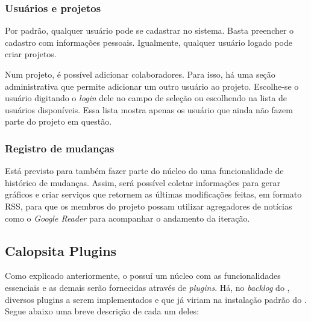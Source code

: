 \subsubsection*{Usuários e projetos}

Por padrão, qualquer usuário pode se cadastrar no sistema. Basta preencher o cadastro com informações pessoais. Igualmente, qualquer usuário logado pode criar projetos.

Num projeto, é possível adicionar colaboradores. Para isso, há uma seção administrativa que permite adicionar um outro usuário ao projeto. Escolhe-se o usuário digitando o \textit{login} dele no campo de seleção ou escolhendo na lista de usuários disponíveis. Essa lista mostra apenas os usuário que ainda não fazem parte do projeto em questão.  

\subsubsection*{Registro de mudanças}

Está previsto para também fazer parte do núcleo do \calopsita{} uma funcionalidade de histórico de mudanças. Assim, será possível coletar informações para gerar gráficos e criar serviços que retornem as últimas modificações feitas, em formato RSS, para que os membros do projeto possam utilizar agregadores de notícias como o \textit{Google Reader} para acompanhar o andamento da iteração.

\subsection{Calopsita Plugins}

Como explicado anteriormente, o \calopsita{} possuí um núcleo com as funcionalidades essenciais e as demais serão fornecidas através de \textit{plugins}. Há, no \textit{backlog} do \calopsita{}, diversos plugins a serem implementados e que já viriam na instalação padrão do \calopsita{}. Segue abaixo uma breve descrição de cada um deles:

